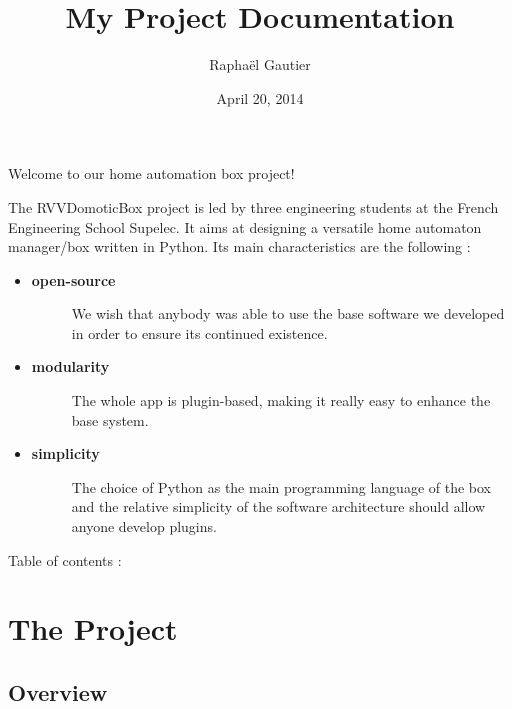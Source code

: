 \documentclass[letterpaper,10pt,english]{sphinxmanual}
\title{My Project Documentation}
\date{April 20, 2014}
\author{Raphaël Gautier}
\begin{document}
\maketitle
\tableofcontents
{}\label{index::doc}


Welcome to our home automation box project!

The RVVDomoticBox project is led by three engineering students at the
French Engineering School Supelec. It aims at designing a versatile
home automaton manager/box written in Python. Its main characteristics
are the following :
\begin{itemize}
\item {} \begin{description}
\item[{\textbf{open-source}}] \leavevmode
We wish that anybody was able to use the base software we developed in order to ensure its continued existence.

\end{description}

\item {} \begin{description}
\item[{\textbf{modularity}}] \leavevmode
The whole app is plugin-based, making it really easy to enhance the base system.

\end{description}

\item {} \begin{description}
\item[{\textbf{simplicity}}] \leavevmode
The choice of Python as the main programming language of the box and the relative simplicity of the software architecture should allow anyone develop plugins.

\end{description}

\end{itemize}

Table of contents :


\chapter{The Project}
\label{the_project:welcome-to-rvvdomoticbox-s-documentation}\label{the_project::doc}\label{the_project:the-project}

\section{Overview}
\label{the_project:overview}
\end{document}
